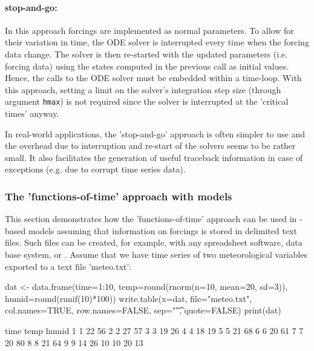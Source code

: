 \documentclass[onecolumn]{article}
\begin{document}
\paragraph{stop-and-go:} In this approach forcings are implemented as normal parameters. To allow for their variation in time, the ODE solver is interrupted every time when the forcing data change. The solver is then re-started with the updated parameters (i.e. forcing data) using the states computed in the previous call as initial values. Hence, the calls to the ODE solver must be embedded within a time-loop. With this approach, setting a limit on the solver's integration step size (through argument \verb|hmax|) is not required since the solver is interrupted at the 'critical times' anyway.

In real-world applications, the 'stop-and-go' approach is often simpler to use and the overhead due to interruption and re-start of the solvers seems to be rather small. It also facilitates the generation of useful traceback information in case of exceptions (e.g. due to corrupt time series data).

\subsubsection{The 'functions-of-time' approach with  models}

This section demonstrates how the 'functions-of-time' approach can be used in -based models assuming that information on forcings is stored in delimited text files. Such files can be created, for example, with any spreadsheet software, data base system, or . Assume that we have time series of two meteorological variables exported to a text file 'meteo.txt':

\begin{Schunk}
\begin{Sinput}
 dat <- data.frame(time=1:10, temp=round(rnorm(n=10, mean=20, sd=3)),
   humid=round(runif(10)*100))
 write.table(x=dat, file="meteo.txt", col.names=TRUE,
   row.names=FALSE, sep="\t", quote=FALSE)
 print(dat)
\end{Sinput}
\begin{Soutput}
   time temp humid
1     1   22    56
2     2   27    57
3     3   19    26
4     4   18    19
5     5   21    68
6     6   20    61
7     7   20    80
8     8   21    64
9     9   14    26
10   10   20    13
\end{Soutput}
\end{Schunk}
\end{document}
